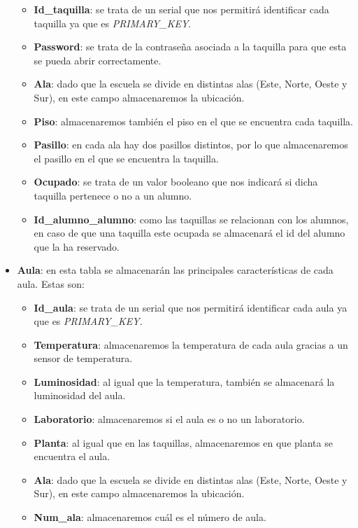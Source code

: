 \documentclass[12pt]{report}
\begin{document}
\begin{itemize}
    \begin{itemize}
        \item\textbf{Id\_taquilla}: se trata de un serial que nos permitirá identificar cada taquilla ya que es \textit{PRIMARY\_KEY}.
        \item \textbf{Password}: se trata de la contraseña asociada a la taquilla para que esta se pueda abrir correctamente.
        \item \textbf{Ala}: dado que la escuela se divide en distintas alas (Este, Norte, Oeste y Sur), en este campo almacenaremos la ubicación.
        \item \textbf{Piso}: almacenaremos también el piso en el que se encuentra cada taquilla.
        \item \textbf{Pasillo}: en cada ala hay dos pasillos distintos, por lo que almacenaremos el pasillo en el que se encuentra la taquilla.
        \item \textbf{Ocupado}: se trata de un valor booleano que nos indicará si dicha taquilla pertenece o no a un alumno.
        \item \textbf{Id\_alumno\_alumno}: como las taquillas se relacionan con los alumnos, en caso de que una taquilla este ocupada se almacenará el id del alumno que la ha reservado.
        \\
    \end{itemize}
    \item \textbf{Aula}: en esta tabla se almacenarán las principales características de cada aula. Estas son:
    \begin{itemize}
        \item\textbf{Id\_aula}: se trata de un serial que nos permitirá identificar cada aula ya que es \textit{PRIMARY\_KEY}.
        \item \textbf{Temperatura}: almacenaremos la temperatura de cada aula gracias a un sensor de temperatura.
        \item \textbf{Luminosidad}: al igual que la temperatura, también se almacenará la luminosidad del aula.
        \item \textbf{Laboratorio}: almacenaremos si el aula es o no un laboratorio.
        \item \textbf{Planta}: al igual que en las taquillas, almacenaremos en que planta se encuentra el aula.
        \item \textbf{Ala}: dado que la escuela se divide en distintas alas (Este, Norte, Oeste y Sur), en este campo almacenaremos la ubicación.
        \item \textbf{Num\_ala}: almacenaremos cuál es el número de aula.

\end{itemize}
\end{itemize}
\end{document}
